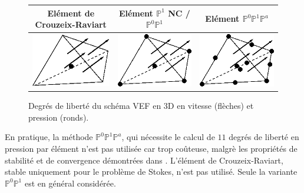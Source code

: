 \begin{appendix}
\begin{figure}[h]
\begin{center}
\begin{tabular}{ccc}
\hline \rowcolor{lightgray}
El\'ement de Crouzeix-Raviart & El\'ement $\mathbb P^1$ NC / $\mathbb P^0 \mathbb P^1$  &El\'ement $\mathbb P^0 \mathbb P^1 \mathbb P^a$\\
\hline
\includegraphics[scale=0.5]{Figs/VEF-3D-P0.png}&
\includegraphics[scale=0.5]{Figs/VEF-3D-P0P1.png}&
\includegraphics[scale=0.5]{Figs/VEF-3D-P0P1Pa.png}
\end{tabular}
\end{center}
\caption{Degrés de liberté du schéma VEF en 3D en vitesse (flèches) et pression (ronds).}
\end{figure}


En pratique, la m\'ethode $\mathbb P^0 \mathbb P^1 \mathbb P^a$, qui n\'ecessite le calcul de $11$ degr\'es de libert\'e en pression par \'el\'ement n'est pas utilis\'ee car trop
co\^uteuse, malgr\`e les propri\'et\'es de stabilit\'e et de convergence d\'emontr\'ees dans \cite{Fortin}. L'\'el\'ement de Crouzeix-Raviart, stable uniquement pour le probl\`eme de
Stokes, n'est pas utilis\'e. Seule la variante  $\mathbb P^0 \mathbb P^1$ est en g\'en\'eral consid\'er\'ee. 


\end{appendix}

